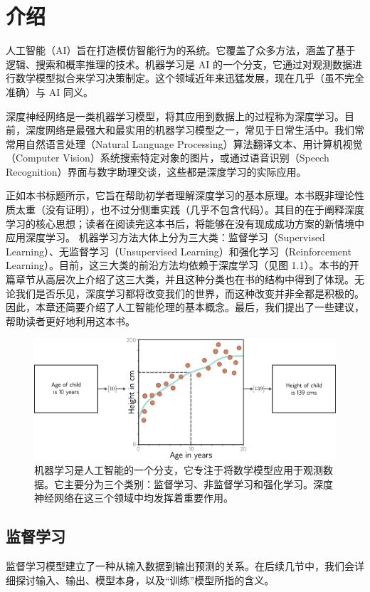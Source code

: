 \chapter{介绍}

人工智能（AI）旨在打造模仿智能行为的系统。它覆盖了众多方法，涵盖了基于逻辑、搜索和概率推理的技术。机器学习是 AI 的一个分支，它通过对观测数据进行数学模型拟合来学习决策制定。这个领域近年来迅猛发展，现在几乎（虽不完全准确）与 AI 同义。

深度神经网络是一类机器学习模型，将其应用到数据上的过程称为深度学习。目前，深度网络是最强大和最实用的机器学习模型之一，常见于日常生活中。我们常常用自然语言处理（Natural Language Processing）算法翻译文本、用计算机视觉（Computer Vision）系统搜索特定对象的图片，或通过语音识别（Speech Recognition）界面与数字助理交谈，这些都是深度学习的实际应用。

正如本书标题所示，它旨在帮助初学者理解深度学习的基本原理。本书既非理论性质太重（没有证明），也不过分侧重实践（几乎不包含代码）。其目的在于阐释深度学习的核心思想；读者在阅读完这本书后，将能够在没有现成成功方案的新情境中应用深度学习。
机器学习方法大体上分为三大类：监督学习（Supervised Learning）、无监督学习（Unsupervised Learning）和强化学习（Reinforcement Learning）。目前，这三大类的前沿方法均依赖于深度学习（见图 1.1）。本书的开篇章节从高层次上介绍了这三大类，并且这种分类也在书的结构中得到了体现。无论我们是否乐见，深度学习都将改变我们的世界，而这种改变并非全都是积极的。因此，本章还简要介绍了人工智能伦理的基本概念。最后，我们提出了一些建议，帮助读者更好地利用这本书。

\begin{figure}[h]
	\centering
	\includegraphics[width=\linewidth]{png/chapter1/IntroAgeHeight}
	\caption{机器学习是人工智能的一个分支，它专注于将数学模型应用于观测数据。它主要分为三个类别：监督学习、非监督学习和强化学习。深度神经网络在这三个领域中均发挥着重要作用。}
\end{figure}


\section{监督学习}
监督学习模型建立了一种从输入数据到输出预测的关系。在后续几节中，我们会详细探讨输入、输出、模型本身，以及“训练”模型所指的含义。

